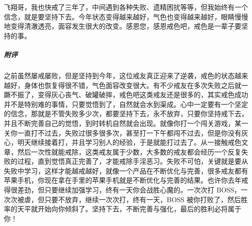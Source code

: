 \begin{case}
    飞翔哥，我也快戒了三年了，中间遇到各种失败、遗精困扰等等，但我始终有一个信念，就是要坚持下去。今年状态变得越来越好，气色也变得越来越好，眼睛慢慢地变得清澈透亮，面容发生很大的改变。感恩您，感恩戒色吧，戒色是一辈子要坚持的事。
    \subparagraph{附评} 之前虽然屡戒屡败，但是坚持到今年，这位戒友真正迎来了逆袭，戒色的状态越来越好，身体也恢复得很不错，气色面容改变很大。有不少戒友在多次失败之后就一蹶不振了，变得灰心丧气、破罐破摔，戒色吧这类戒友还是很多的，其实戒色成功并不是特别难的事情，只要觉悟到了，自然就会水到渠成。心中一定要有一个坚定的信念，那就是不管失败多少次，都要坚持下去，永不放弃，只要你坚持戒下去，并且不断完善自己的觉悟，到时转机自然就会出现。就像你打一个闯关游戏，某一关你一直打不过去，失败过很多很多次，甚至打一下午都闯不过去，但是你没有灰心，明天继续接着打，并且学习别人的经验，于是就能打过去了。从一接触戒色文章，然后一次性就能戒除，这类戒友属于少数，大多数的戒友都会经历一个反复失败的过程，直到觉悟真正完善了，才能戒除手淫恶习。失败不可怕，关键就是要从失败中学习，这样才能越戒越好，就像一个产品在不断优化与完善，很多戒友都有苹果手机，你现在拿在手里的苹果手机就是不断优化与完善的结果。也许你去年戒得很差劲，但只要继续加强学习，终有一天你会战胜心魔的。一次次打 BOSS，一次次被虐，但只要不放弃，继续一次次打，终有一天，BOSS 被你打败了，然后胜率的天平就开始向你倾斜了。坚持下去，不断完善与强化，最后的胜利必将属于你！
\end{case}

